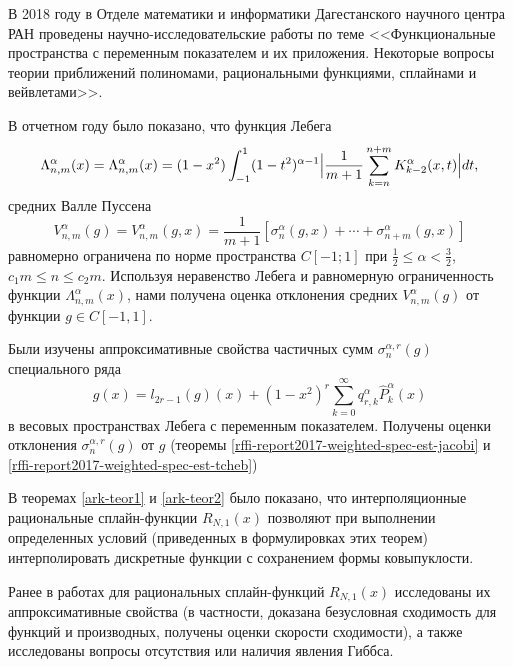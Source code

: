 \Conclusion

В 2018 году в Отделе математики и информатики Дагестанского научного центра РАН проведены научно-исследовательские работы по теме
<<Функциональные пространства с переменным показателем и их приложения. Некоторые вопросы теории приближений полиномами, рациональными функциями, сплайнами и вейвлетами>>.

В отчетном году было показано, что функция Лебега
$$\Lambda_{n,m}^\alpha(x)=\Lambda_{n,m}^\alpha(x)=
(1-x^2)\int_{-1}^{1}(1-t^2)^{\alpha-1}\Bigl|
\frac{1}{m+1}\sum\limits_{k=n}^{n+m}K^\alpha_{k-2}(x,t)
\Bigr|dt,$$
средних Валле Пуссена
$$V_{n,m}^\alpha(g)=V_{n,m}^\alpha(g,x)=\frac{1}{m+1}[\sigma_n^\alpha(g,x)+\cdots+\sigma_{n+m}^\alpha(g,x)]$$
равномерно ограничена по норме пространства $C[-1;1]$ при $\frac12\le\alpha<\frac32$, $c_1m \le n\le c_2m$. Используя неравенство Лебега и равномерную ограниченность функции $\Lambda_{n,m}^\alpha(x)$, нами получена оценка отклонения средних $V_{n,m}^\alpha(g)$  от  функции $g\in C[-1,1]$.


Были изучены аппроксимативные свойства частичных сумм $\sigma_{n}^{\alpha,r}(g)$ специального ряда
$$g(x)=l_{2r-1}(g)(x)+(1-x^2)^r\sum_{k=0}^\infty q_{r,k}^\alpha\hat P_k^\alpha(x)$$ в весовых пространствах Лебега с переменным показателем. Получены оценки отклонения $\sigma_{n}^{\alpha,r}(g)$ от $g$ (теоремы \ref{rffi-report2017-weighted-spec-est-jacobi} и \ref{rffi-report2017-weighted-spec-est-tcheb})





В теоремах \ref{ark-teor1} и \ref{ark-teor2} было показано, что интерполяционные рациональные
сплайн-функции $R_{N,1}(x)$ позволяют при выполнении определенных условий
(приведенных в формулировках этих теорем) интерполировать дискретные функции
с сохранением формы ковыпуклости.

Ранее в работах \cite{ark-12,ark-13,ark-14,ark-15} для рациональных
сплайн-функций $R_{N,1}(x)$ исследованы их аппроксимативные свойства
 (в частности, доказана безусловная сходимость для функций и производных, получены
 оценки скорости сходимости), а также исследованы вопросы отсутствия или наличия
явления Гиббса.

